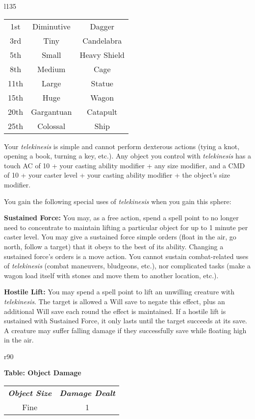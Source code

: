 {\begin{wraptable}[11]{l}{135\unitlength}
\begin{tabular}{ccc}
		1st	& Diminutive& Dagger		\\
		3rd	& Tiny		& Candelabra	\\
		5th	& Small		& Heavy Shield	\\
		8th	& Medium	& Cage			\\
		11th& Large		& Statue		\\
		15th& Huge		& Wagon			\\
		20th& Gargantuan& Catapult		\\
		25th& Colossal	& Ship
	\end{tabular}
\end{wraptable}	
\par Your \textit{telekinesis} is simple and cannot perform dexterous actions (tying a knot, opening a book, turning a key, etc.). Any object you control with \textit{telekinesis} has a touch AC of 10 + your casting ability modifier + any size modifier, and a CMD of 10 + your caster level + your casting ability modifier + the object's size modifier.
\par You gain the following special uses of \textit{telekinesis} when you gain this sphere:
\par \textbf{Sustained Force:} You may, as a free action, spend a spell point to no longer need to concentrate to maintain lifting a particular object for up to 1 minute per caster level. You may give a sustained force simple orders (float in the air, go north, follow a target) that it obeys to the best of its ability. Changing a sustained force's orders is a move action. You cannot sustain combat-related uses of \textit{telekinesis} (combat maneuvers, bludgeons, etc.), nor complicated tasks (make a wagon load itself with stones and move them to another location, etc.).
\par \textbf{Hostile Lift:} You may spend a spell point to lift an unwilling creature with \textit{telekinesis}. The target is allowed a Will save to negate this effect, plus an additional Will save each round the effect is maintained. If a hostile lift is sustained with Sustained Force, it only lasts until the target succeeds at its save. A creature may suffer falling damage if they successfully save while floating high in the air.%
\begin{wraptable}{r}{90\unitlength}%
	\raggedright \textbf{Table: Object Damage}
	\small
	\begin{tabular}{cc}
		\rowcolor{gray!50}
		\textbf{\textit{Object Size}} & \textbf{\textit{Damage Dealt}}\\
		Fine		& 1		\\

\end{tabular}
\end{wraptable}}
